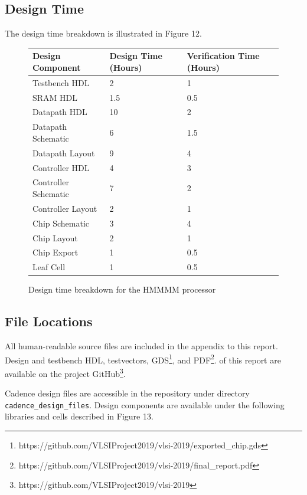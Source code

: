 \documentclass[12pt]{article}
\begin{document}
\subsection{Design Time}

The design time breakdown is illustrated in Figure 12.

\begin{figure}[H]
    \begin{center}
    \begin{tabular}{lll}
        Design Component & Design Time (Hours) & Verification Time (Hours) \\
        \hline
        Testbench HDL & 2 & 1 \\
        SRAM HDL & 1.5 & 0.5 \\
        Datapath HDL & 10 & 2 \\
        Datapath Schematic & 6 & 1.5\\
        Datapath Layout & 9 & 4 \\
        Controller HDL & 4 & 3 \\
        Controller Schematic & 7 & 2 \\
        Controller Layout & 2 & 1 \\
        Chip Schematic & 3 & 4 \\
        Chip Layout & 2 & 1\\
        Chip Export & 1 & 0.5 \\
        Leaf Cell & 1 & 0.5 \\
    \end{tabular}
    \caption{Design time breakdown for the HMMMM processor}
    \end{center}
    \label{fig:designtime}
\end{figure}

\subsection{File Locations}

All human-readable source files are included in the appendix to this report. Design and testbench HDL, testvectors, GDS\footnote{https://github.com/VLSIProject2019/vlsi-2019/exported\_chip.gds}, and PDF\footnote{https://github.com/VLSIProject2019/vlsi-2019/final\_report.pdf}. of this report are available on the project GitHub\footnote{https://github.com/VLSIProject2019/vlsi-2019}. 

Cadence design files are accessible in the repository under directory \texttt{cadence\_design\_files}. Design components are available under the following libraries and cells described in Figure 13.
\end{document}
